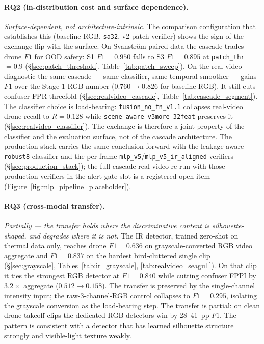 \paragraph{RQ2 (in-distribution cost and surface dependence).}
\emph{Surface-dependent, not architecture-intrinsic.} The comparison configuration that establishes this (baseline RGB, \texttt{sa32}, v2 patch verifier) shows the sign of the exchange flip with the surface. On Svanstr\"om paired data the cascade trades drone $F1$ for OOD safety: S1 $F1=0.950$ falls to S3 $F1=0.895$ at \texttt{patch\_thr}$=0.9$ (\S\ref{sec:patch_threshold}, Table~\ref{tab:patch_sweep}). On the real-video diagnostic the same cascade --- same classifier, same temporal smoother --- gains $F1$ over the Stage-1 RGB number ($0.760 \to 0.826$ for baseline RGB). It still cuts confuser FPR threefold (\S\ref{sec:realvideo_cascade}, Table~\ref{tab:cascade_segment}). The classifier choice is load-bearing: \texttt{fusion\_no\_fn\_v1.1} collapses real-video drone recall to $R=0.128$ while \texttt{scene\_aware\_v3more\_32feat} preserves it (\S\ref{sec:realvideo_classifier}). The exchange is therefore a joint property of the classifier and the evaluation surface, not of the cascade architecture. The production stack carries the same conclusion forward with the leakage-aware \texttt{robust8} classifier and the per-frame \texttt{mlp\_v5}/\texttt{mlp\_v5\_ir\_aligned} verifiers (\S\ref{sec:production_stack}); the full-cascade real-video re-run with those production verifiers in the alert-gate slot is a registered open item (Figure~\ref{fig:mlp_pipeline_placeholder}).

\paragraph{RQ3 (cross-modal transfer).}
\emph{Partially --- the transfer holds where the discriminative content is silhouette-shaped, and degrades where it is not.} The IR detector, trained zero-shot on thermal data only, reaches drone $F1=0.636$ on grayscale-converted RGB video aggregate and $F1=0.837$ on the hardest bird-cluttered single clip (\S\ref{sec:grayscale}, Tables~\ref{tab:ir_grayscale}, \ref{tab:realvideo_seagull}). On that clip it ties the strongest RGB detector at $F1=0.840$ while cutting confuser FPPI by $3.2\times$ aggregate ($0.512 \to 0.158$). The transfer is preserved by the single-channel intensity input; the raw-3-channel-RGB control collapses to $F1=0.295$, isolating the grayscale conversion as the load-bearing step. The transfer is partial: on clean drone takeoff clips the dedicated RGB detectors win by 28--41~pp $F1$. The pattern is consistent with a detector that has learned silhouette structure strongly and visible-light texture weakly.

